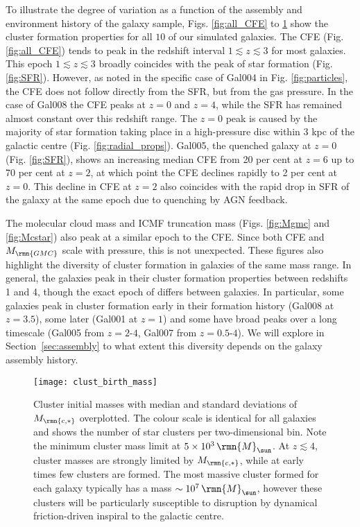 \documentclass[fleqn,usenatbib]{mnras}
\newcommand\Msun{\,\rmn{M}_{\sun}}
\newcommand{\numgal}{10}
\newcommand{\Mcstar}{M_\rmn{c,\ast}}
\newcommand{\Mgmc}{M_\rmn{GMC}}
\begin{document}
To illustrate the degree of variation as a function of the assembly and environment history of the galaxy sample, Figs. \ref{fig:all_CFE} to \ref{fig:Mcinit} show the cluster formation properties for all $\numgal$ of our simulated galaxies. The CFE (Fig. \ref{fig:all_CFE}) tends to peak in the redshift interval $1 \lesssim z \lesssim 3$ for most galaxies. This epoch $1 \lesssim z \lesssim 3$ broadly coincides with the peak of star formation (Fig. \ref{fig:SFR}). However, as noted in the specific case of Gal004 in Fig. \ref{fig:particles}, the CFE does not follow directly from the SFR, but from the gas pressure. In the case of Gal008 the CFE peaks at $z=0$ and $z=4$, while the SFR has remained almost constant over this redshift range. The $z=0$ peak is caused by the majority of star formation taking place in a high-pressure disc within 3 kpc of the galactic centre (Fig. \ref{fig:radial_props}). 
Gal005, the quenched galaxy at $z=0$ (Fig. \ref{fig:SFR}), shows an increasing median CFE from 20 per cent at $z=6$ up to 70 per cent at $z=2$, at which point the CFE declines rapidly to 2 per cent at $z=0$. This decline in CFE at $z=2$ also coincides with the rapid drop in SFR of the galaxy at the same epoch due to quenching by AGN feedback.

The molecular cloud mass and ICMF truncation mass (Figs. \ref{fig:Mgmc} and \ref{fig:Mcstar}) also peak at a similar epoch to the CFE. Since both CFE and $\Mgmc$ scale with pressure, this is not unexpected. 
These figures also highlight the diversity of cluster formation in galaxies of the same mass range. 
In general, the galaxies peak in their cluster formation properties between redshifts 1 and 4, though the exact epoch of differs between galaxies. In particular, some galaxies peak in cluster formation early in their formation history (Gal008 at $z=3.5$), some later (Gal001 at $z=1$) and some have broad peaks over a long timescale (Gal005 from $z=2$-$4$, Gal007 from $z=0.5$-$4$). We will explore in Section~\ref{sec:assembly} to what extent this diversity depends on the galaxy assembly history.

\begin{figure*}
  \texttt{[image: clust\_birth\_mass]}
  \caption{Cluster initial masses with median and standard deviations of $\Mcstar$ overplotted. The colour scale is identical for all galaxies and shows the number of star clusters per two-dimensional bin. Note the minimum cluster mass limit at $5 \times 10^3 \Msun$. At $z \lesssim 4$, cluster masses are strongly limited by $\Mcstar$, while at early times few clusters are formed. The most massive cluster formed for each galaxy typically has a mass $\sim10^7 \Msun$, however these clusters will be particularly susceptible to disruption by dynamical friction-driven inspiral to the galactic centre.}

  \label{fig:Mcinit}
\end{figure*}
\end{document}
